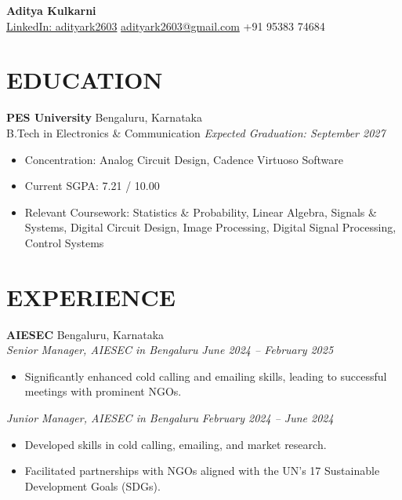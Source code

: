 \documentclass[11pt]{article}
\begin{document}
\begin{center}
    \textbf{\Huge Aditya Kulkarni} \\
    \vspace{0.5em}
    \href{https://www.linkedin.com/in/adityark2603}{LinkedIn: adityark2603} \quad\textbullet\quad
    \href{mailto:adityark2603@gmail.com}{adityark2603@gmail.com} \quad\textbullet\quad
    +91 95383 74684
\end{center}

\section*{EDUCATION}

\textbf{PES University} \hfill Bengaluru, Karnataka \\
B.Tech in Electronics \& Communication \hfill \emph{Expected Graduation: September 2027} \\
\begin{itemize}[noitemsep, topsep=0pt]
    \item Concentration: Analog Circuit Design, Cadence Virtuoso Software
    \item Current SGPA: 7.21 / 10.00
    \item Relevant Coursework: Statistics \& Probability, Linear Algebra, Signals \& Systems, Digital Circuit Design, Image Processing, Digital Signal Processing, Control Systems
\end{itemize}

\section*{EXPERIENCE}

\textbf{AIESEC} \hfill Bengaluru, Karnataka \\

\textit{Senior Manager, AIESEC in Bengaluru} \hfill \emph{June 2024 – February 2025}
\begin{itemize}[noitemsep, topsep=0pt]
    \item Significantly enhanced cold calling and emailing skills, leading to successful meetings with prominent NGOs.
\end{itemize}

\textit{Junior Manager, AIESEC in Bengaluru} \hfill \emph{February 2024 – June 2024}
\begin{itemize}[noitemsep, topsep=0pt]
    \item Developed skills in cold calling, emailing, and market research.
    \item Facilitated partnerships with NGOs aligned with the UN’s 17 Sustainable Development Goals (SDGs).
\end{itemize}
\end{document}
